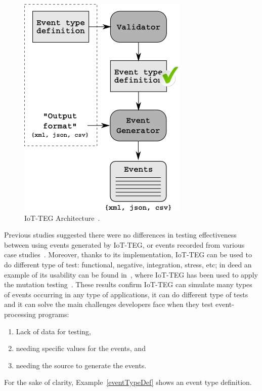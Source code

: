 \documentclass[review]{elsarticle}
\begin{document}
\begin{figure}[!ht]
	\centering
	\includegraphics[scale=0.7]{Images/IoT-EGArquitecture}
	\caption[IoT-TEG Architecture]{IoT-TEG Architecture~\cite{TesisGutierrez2017,Gutierrez2017}.}
	\label{fig:IoT-EGArquitecture}
\end{figure}
\newpage
Previous studies suggested there were no differences in testing effectiveness between using events
generated by IoT-TEG, or events recorded from various case studies~\cite{Gutierrez2017,TesisGutierrez2017}.
Moreover, thanks to its implementation, IoT-TEG can be used to do different type of test: functional,
negative, integration, stress, etc; in deed an example of its usability can be found 
in~\cite{TesisGutierrez2017,gutierrez2018}, where IoT-TEG has been used to apply the mutation 
testing~\cite{jia2011}. These results confirm IoT-TEG can 
simulate many types of events occurring in any type of applications, it can do different type of tests
and it can solve the main challenges developers face when they test event-processing programs:
\begin{enumerate}
	\item Lack of data for testing,
	\item needing specific values for the events, and
	\item needing the source to generate the events.
\end{enumerate}

For the sake of clarity, Example~\ref{eventTypeDef} shows an event type
definition. \newpage
\end{document}
